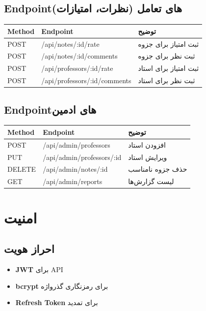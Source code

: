 \documentclass[12pt, a4paper]{article}
\begin{document}
\subsection{Endpointهای تعامل (نظرات، امتیازات)}

\begin{center}
\begin{tabular}{|l|l|l|}
\hline
\textbf{Method} & \textbf{Endpoint} & \textbf{توضیح} \\
\hline
POST & /api/notes/:id/rate & ثبت امتیاز برای جزوه \\
\hline
POST & /api/notes/:id/comments & ثبت نظر برای جزوه \\
\hline
POST & /api/professors/:id/rate & ثبت امتیاز برای استاد \\
\hline
POST & /api/professors/:id/comments & ثبت نظر برای استاد \\
\hline
\end{tabular}
\end{center}

\subsection{Endpointهای ادمین}

\begin{center}
\begin{tabular}{|l|l|l|}
\hline
\textbf{Method} & \textbf{Endpoint} & \textbf{توضیح} \\
\hline
POST & /api/admin/professors & افزودن استاد \\
\hline
PUT & /api/admin/professors/:id & ویرایش استاد \\
\hline
DELETE & /api/admin/notes/:id & حذف جزوه نامناسب \\
\hline
GET & /api/admin/reports & لیست گزارش‌ها \\
\hline
\end{tabular}
\end{center}

\section{امنیت}

\subsection{احراز هویت}
\begin{itemize}
    \item \textbf{JWT} برای API
    \item \textbf{bcrypt} برای رمزنگاری گذرواژه
    \item \textbf{Refresh Token} برای تمدید
\end{itemize}
\end{document}
